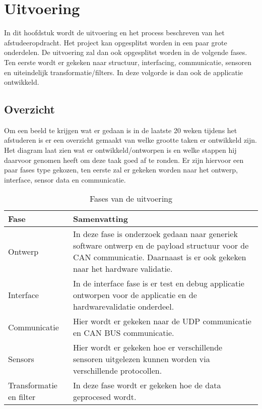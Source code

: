 \chapter{Uitvoering}
In dit hoofdstuk wordt de uitvoering en het process beschreven van het afstudeeropdracht. Het project kan opgesplitst worden in een paar grote onderdelen. De uitvoering zal dan ook opgesplitst worden in de volgende fases. Ten eerste wordt er gekeken naar structuur, interfacing, communicatie, sensoren en uiteindelijk transformatie/filters. In deze volgorde is dan ook de applicatie ontwikkeld.

\section{Overzicht}
Om een beeld te krijgen wat er gedaan is in de laatste 20 weken tijdens het afstuderen is er een overzicht gemaakt van welke grootte taken er ontwikkeld zijn. Het diagram laat zien wat er ontwikkeld/ontworpen is en welke stappen hij daarvoor genomen heeft om deze taak goed af te ronden. Er zijn hiervoor een paar fases type gekozen, ten eerste zal er gekeken worden naar het ontwerp, interface, sensor data en communicatie.

\begin{table}[h!]
	\centering
	\caption{Fases van de uitvoering}
	\label{tab:UitvoeringOverzicht}
	\begin{tabular}{lp{13cm}}
	\toprule
	\textbf{Fase} & \textbf{Samenvatting} \\ \midrule
	Ontwerp & In deze fase is onderzoek gedaan naar generiek software ontwerp en de payload structuur voor de CAN communicatie. Daarnaast is er ook gekeken naar het hardware validatie. \\
	Interface & In de interface fase is er test en debug applicatie ontworpen voor de applicatie en de hardwarevalidatie onderdeel. \\
	Communicatie & Hier wordt er gekeken naar de UDP communicatie en CAN BUS communicatie.                      \\
	Sensors  & Hier wordt er gekeken hoe er verschillende sensoren uitgelezen kunnen worden via verschillende protocollen.                      \\ 
	Transformatie en filter & In deze fase wordt er gekeken hoe de data geprocesed wordt. \\ \bottomrule
	\end{tabular}
\end{table}

\newpage
